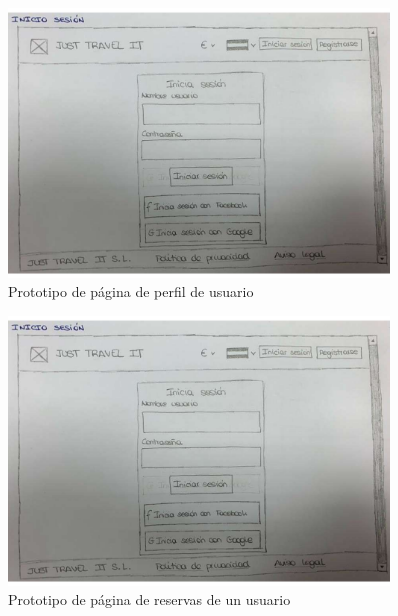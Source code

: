 \begin{figure}[H]
    \centering
    \includegraphics[page=10, width=0.9\textwidth]{./Imagenes/Prototipo/Prototipos definitivos - Iteracion I.pdf}
    \caption{Prototipo de página de perfil de usuario}
    \label{fig:prot_perfil}
\end{figure}

\begin{figure}[H]
    \centering
    \includegraphics[page=12, width=0.9\textwidth]{./Imagenes/Prototipo/Prototipos definitivos - Iteracion I.pdf}
    \caption{Prototipo de página de reservas de un usuario}
    \label{fig:prot_reservas_usuario}
\end{figure}

